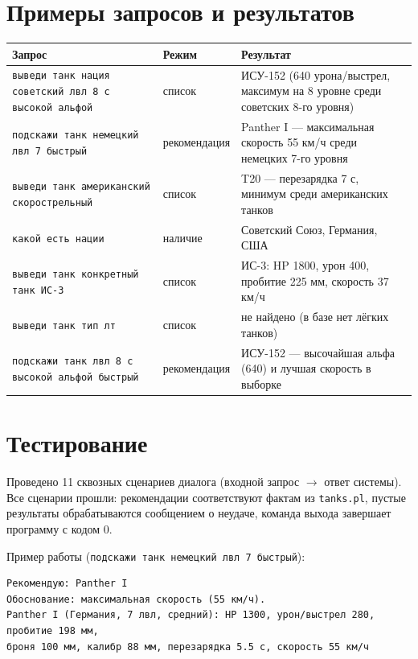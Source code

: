 \documentclass[12pt,a4paper]{article}
\begin{document}
\section*{Примеры запросов и результатов}

\begin{center}
\begin{tabular}{llp{7cm}}
\toprule
Запрос & Режим & Результат \\
\midrule
\texttt{выведи танк нация советский лвл 8 с высокой альфой} & список & ИСУ-152 (640 урона/выстрел, максимум на 8 уровне среди советских 8-го уровня) \\
\texttt{подскажи танк немецкий лвл 7 быстрый} & рекомендация & Panther I --- максимальная скорость 55 км/ч среди немецких 7-го уровня \\
\texttt{выведи танк американский скорострельный} & список & T20 --- перезарядка 7 с, минимум среди американских танков \\
\texttt{какой есть нации} & наличие & Советский Союз, Германия, США \\
\texttt{выведи танк конкретный танк ИС-3} & список & ИС-3: HP 1800, урон 400, пробитие 225 мм, скорость 37 км/ч \\
\texttt{выведи танк тип лт} & список & не найдено (в базе нет лёгких танков) \\
\texttt{подскажи танк лвл 8 с высокой альфой быстрый} & рекомендация & ИСУ-152 --- высочайшая альфа (640) и лучшая скорость в выборке \\
\bottomrule
\end{tabular}
\end{center}

\section*{Тестирование}

Проведено 11 сквозных сценариев диалога (входной запрос $\rightarrow$ ответ системы). Все сценарии прошли: рекомендации соответствуют фактам из \texttt{tanks.pl}, пустые результаты обрабатываются сообщением о неудаче, команда выхода завершает программу с кодом 0.

Пример работы (\texttt{подскажи танк немецкий лвл 7 быстрый}):
\begin{lstlisting}
Рекомендую: Panther I
Обоснование: максимальная скорость (55 км/ч).
Panther I (Германия, 7 лвл, средний): HP 1300, урон/выстрел 280, пробитие 198 мм,
броня 100 мм, калибр 88 мм, перезарядка 5.5 с, скорость 55 км/ч
\end{lstlisting}
\end{document}
